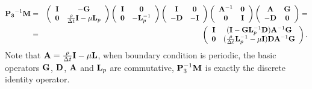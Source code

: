 \documentclass[9pt]{article}
\begin{document}
\begin{eqnarray}\label{preconditioned_sys}
{\bf P_3}^{-1} {\bf M} &=&
\left(\begin{array}{cc}
{\bf I} & - {\bf G} \\
{\bf 0}      & \frac{\rho}{\Delta t}{\bf I}- \mu {\bf L}_p
\end{array}\right)
\left(\begin{array}{cc}
{\bf I}     &  {\bf 0} \\
{\bf 0}     &  -{\bf L}_p^{-1}
\end{array}\right)
\left(\begin{array}{cc}
{\bf I}      &   {\bf 0} \\
-{\bf D}     &  -{\bf I}
\end{array}\right)
\left(\begin{array}{cc}
{\bf A}^{-1}       & {\bf 0} \\
{\bf 0}            & {\bf I}
\end{array}\right)
\left(\begin{array}{cc}
{\bf A}       & {\bf G} \\
-{\bf D}      & {\bf 0}
\end{array}\right) = \cr
&=& \left(\begin{array}{cc}
{\bf I}        & ({\bf I}-{\bf G}{\bf L}_p^{-1}{\bf D}){\bf A}^{-1} {\bf G} \\
{\bf 0}        & (\frac{\rho}{\Delta t} {\bf L}_p^{-1} -\mu {\bf I}) {\bf D} {\bf A}^{-1}{\bf G}
\end{array}\right).
\end{eqnarray}
Note that ${\bf A} = \frac{\rho}{\Delta t} {\bf I} - \mu {\bf L}$, when boundary condition is periodic, the basic operators ${\bf G}$, ${\bf D}$, ${\bf A}$ and ${\bf L}_p$ are commutative, ${\bf P}_3^{-1} {\bf M}$ is exactly the discrete identity operator.
\end{document}
